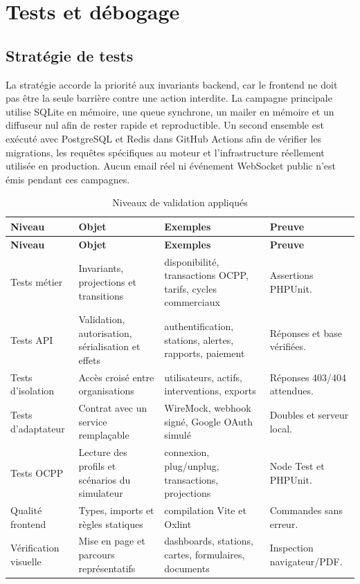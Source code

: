 \section{Tests et débogage}

\subsection{Stratégie de tests}

La stratégie accorde la priorité aux invariants backend, car le frontend ne doit
pas être la seule barrière contre une action interdite. La campagne principale
utilise SQLite en mémoire, une queue synchrone, un mailer en mémoire et un
diffuseur nul afin de rester rapide et reproductible. Un second ensemble est
exécuté avec PostgreSQL et Redis dans GitHub Actions afin de vérifier les
migrations, les requêtes spécifiques au moteur et l'infrastructure réellement
utilisée en production. Aucun email réel ni événement WebSocket public n'est
émis pendant ces campagnes.

\begin{longtable}{|p{2.8cm}|p{3.9cm}|p{3.9cm}|p{2.8cm}|}
  \caption{Niveaux de validation appliqués}
  \label{tab:implementation-test-strategy}\\
  \hline
  \textbf{Niveau} & \textbf{Objet} & \textbf{Exemples} &
  \textbf{Preuve}\\
  \hline
  \endfirsthead
  \hline
  \textbf{Niveau} & \textbf{Objet} & \textbf{Exemples} &
  \textbf{Preuve}\\
  \hline
  \endhead
  Tests métier & Invariants, projections et transitions &
  disponibilité, transactions OCPP, tarifs, cycles commerciaux &
  Assertions PHPUnit.\\\hline
  Tests API & Validation, autorisation, sérialisation et effets &
  authentification, stations, alertes, rapports, paiement &
  Réponses et base vérifiées.\\\hline
  Tests d'isolation & Accès croisé entre organisations &
  utilisateurs, actifs, interventions, exports &
  Réponses 403/404 attendues.\\\hline
  Tests d'adaptateur & Contrat avec un service remplaçable &
  WireMock, webhook signé, Google OAuth simulé &
  Doubles et serveur local.\\\hline
  Tests OCPP & Lecture des profils et scénarios du simulateur &
  connexion, plug/unplug, transactions, projections &
  Node Test et PHPUnit.\\\hline
  Qualité frontend & Types, imports et règles statiques &
  compilation Vite et Oxlint &
  Commandes sans erreur.\\\hline
  Vérification visuelle & Mise en page et parcours représentatifs &
  dashboards, stations, cartes, formulaires, documents &
  Inspection navigateur/PDF.\\
  \hline
\end{longtable}


